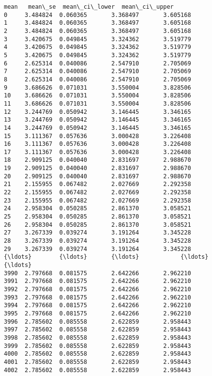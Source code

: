 \documentclass[11pt]{article}
\begin{document}
    \begin{Verbatim}[commandchars=\\\{\}]
          mean   mean\_se  mean\_ci\_lower  mean\_ci\_upper
0     3.484824  0.060365       3.368497       3.605168
1     3.484824  0.060365       3.368497       3.605168
2     3.484824  0.060365       3.368497       3.605168
3     3.420675  0.049845       3.324362       3.519779
4     3.420675  0.049845       3.324362       3.519779
5     3.420675  0.049845       3.324362       3.519779
6     2.625314  0.040086       2.547910       2.705069
7     2.625314  0.040086       2.547910       2.705069
8     2.625314  0.040086       2.547910       2.705069
9     3.686626  0.071031       3.550004       3.828506
10    3.686626  0.071031       3.550004       3.828506
11    3.686626  0.071031       3.550004       3.828506
12    3.244769  0.050942       3.146445       3.346165
13    3.244769  0.050942       3.146445       3.346165
14    3.244769  0.050942       3.146445       3.346165
15    3.111367  0.057636       3.000428       3.226408
16    3.111367  0.057636       3.000428       3.226408
17    3.111367  0.057636       3.000428       3.226408
18    2.909125  0.040040       2.831697       2.988670
19    2.909125  0.040040       2.831697       2.988670
20    2.909125  0.040040       2.831697       2.988670
21    2.155955  0.067482       2.027669       2.292358
22    2.155955  0.067482       2.027669       2.292358
23    2.155955  0.067482       2.027669       2.292358
24    2.958304  0.050285       2.861370       3.058521
25    2.958304  0.050285       2.861370       3.058521
26    2.958304  0.050285       2.861370       3.058521
27    3.267339  0.039274       3.191264       3.345228
28    3.267339  0.039274       3.191264       3.345228
29    3.267339  0.039274       3.191264       3.345228
{\ldots}        {\ldots}       {\ldots}            {\ldots}            {\ldots}
3990  2.797668  0.081575       2.642266       2.962210
3991  2.797668  0.081575       2.642266       2.962210
3992  2.797668  0.081575       2.642266       2.962210
3993  2.797668  0.081575       2.642266       2.962210
3994  2.797668  0.081575       2.642266       2.962210
3995  2.797668  0.081575       2.642266       2.962210
3996  2.785602  0.085558       2.622859       2.958443
3997  2.785602  0.085558       2.622859       2.958443
3998  2.785602  0.085558       2.622859       2.958443
3999  2.785602  0.085558       2.622859       2.958443
4000  2.785602  0.085558       2.622859       2.958443
4001  2.785602  0.085558       2.622859       2.958443
4002  2.785602  0.085558       2.622859       2.958443

\end{Verbatim}
\end{document}
